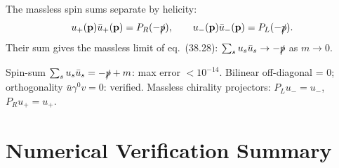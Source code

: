 \documentclass[12pt]{article}
\newcommand{\verified}[1]{\textcolor{verifygreen}{\checkmark\; #1}}
\begin{document}
The massless spin sums separate by helicity:
\begin{equation}
  u_+(\mathbf{p})\bar u_+(\mathbf{p}) = P_R(-\slashed{p}), \qquad
  u_-(\mathbf{p})\bar u_-(\mathbf{p}) = P_L(-\slashed{p}).
\end{equation}
Their sum gives the massless limit of eq.~(38.28): $\sum_s u_s\bar u_s \to -\slashed{p}$ as $m\to 0$.

\verified{Spin-sum $\sum_s u_s\bar u_s = -\slashed{p}+m$: max error $<10^{-14}$.}
\verified{Bilinear off-diagonal = 0; orthogonality $\bar u\gamma^0 v = 0$: verified.}
\verified{Massless chirality projectors: $P_Lu_- = u_-$, $P_Ru_+ = u_+$.}

\section{Numerical Verification Summary}
\end{document}
